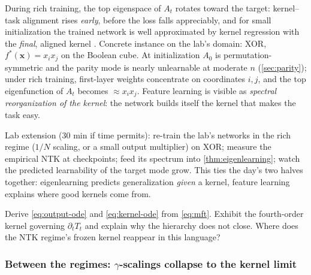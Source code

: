 \documentclass[11pt]{article}
\newcommand{\bv}[1]{\boldsymbol{#1}}
\begin{document}
\begin{example}
\label{ex:silent-alignment}
During rich training, the top eigenspace of $A_t$ rotates toward the
target: kernel--task alignment rises \emph{early}, before the loss falls
appreciably, and for small initialization the trained network is well
approximated by kernel regression with the \emph{final}, aligned kernel
\cite{atanasov2022silent}. Concrete instance on the lab's domain: XOR,
$f^{*}(\bv{x}) = x_i x_j$ on the Boolean cube. At initialization $A_0$ is
permutation-symmetric and the parity mode is nearly unlearnable at moderate
$n$ (\cref{sec:parity}); under rich training, first-layer weights
concentrate on coordinates $i, j$, and the top eigenfunction of $A_t$
becomes $\approx x_i x_j$. Feature learning is visible as \emph{spectral
reorganization of the kernel}: the network builds itself the kernel that
makes the task easy.
\end{example}

\begin{callout}[tip]
Lab extension (30 min if time permits): re-train the lab's networks in the
rich regime ($1/N$ scaling, or a small output multiplier) on XOR; measure
the empirical NTK at checkpoints; feed its spectrum into
\cref{thm:eigenlearning}; watch the predicted learnability of the target
mode grow. This ties the day's two halves together: eigenlearning predicts
generalization \emph{given} a kernel, feature learning explains where good
kernels come from.
\end{callout}

\begin{exercise}
\label{ex:kernel-evolution}
Derive \cref{eq:output-ode} and \cref{eq:kernel-ode} from \cref{eq:mft}.
Exhibit the fourth-order kernel governing $\partial_t T_t$ and explain why
the hierarchy does not close. Where does the NTK regime's frozen kernel
reappear in this language?
\end{exercise}

\subsubsection{Between the regimes: $\gamma$-scalings collapse to the kernel limit}
\label{sec:gamma}
\end{document}
